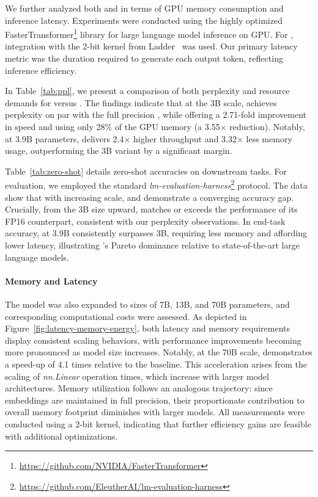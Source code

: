 We further analyzed both  and  in terms of GPU memory consumption and inference latency. Experiments were conducted using the highly optimized FasterTransformer\footnote{\url{https://github.com/NVIDIA/FasterTransformer}} library for large language model inference on GPU. For , integration with the 2-bit kernel from Ladder~\cite{ladder} was used. Our primary latency metric was the duration required to generate each output token, reflecting inference efficiency.

In Table~\ref{tab:ppl}, we present a comparison of both perplexity and resource demands for  versus . The findings indicate that at the 3B scale,  achieves perplexity on par with the full precision , while offering a 2.71-fold improvement in speed and using only 28\% of the GPU memory (a 3.55$\times$ reduction). Notably, at 3.9B parameters,  delivers 2.4$\times$ higher throughput and 3.32$\times$ less memory usage, outperforming the 3B  variant by a significant margin.

Table~\ref{tab:zero-shot} details zero-shot accuracies on downstream tasks. For evaluation, we employed the standard \emph{lm-evaluation-harness}\footnote{\url{https://github.com/EleutherAI/lm-evaluation-harness}} protocol. The data show that with increasing scale,  and  demonstrate a converging accuracy gap. Crucially, from the 3B size upward,  matches or exceeds the performance of its FP16 counterpart, consistent with our perplexity observations. In end-task accuracy,  at 3.9B consistently surpasses  3B, requiring less memory and affording lower latency, illustrating 's Pareto dominance relative to state-of-the-art large language models.

\paragraph{Memory and Latency}

The model was also expanded to sizes of 7B, 13B, and 70B parameters, and corresponding computational costs were assessed. As depicted in Figure~\ref{fig:latency-memory-energy}, both latency and memory requirements display consistent scaling behaviors, with performance improvements becoming more pronounced as model size increases. Notably, at the 70B scale,  demonstrates a speed-up of 4.1 times relative to the  baseline. This acceleration arises from the scaling of \emph{nn.Linear} operation times, which increase with larger model architectures. Memory utilization follows an analogous trajectory: since embeddings are maintained in full precision, their proportionate contribution to overall memory footprint diminishes with larger models. All measurements were conducted using a 2-bit kernel, indicating that further efficiency gains are feasible with additional optimizations.

